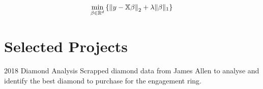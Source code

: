 \documentclass{tccv}
\begin{document}
\vspace{0.5cm}

\begin{equation*}
  \min_{\beta \in \mathbb{R}^{d}}\left\{\left\|y - \mathbb{X}\beta \right\|_{2}+ \lambda \|\beta \|_{1}\right\}\\
\end{equation*}

\vspace{0.5cm}




\vspace{5cm}








\section{Selected Projects}

\begin{yearlist}
\item{2018} {Diamond Analysis} {Scrapped diamond data from James Allen
  to analyse and identify the best diamond to purchase for the
  engagement ring.}

  
\end{yearlist}
\end{document}
